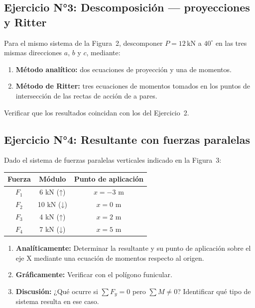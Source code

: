 \documentclass[11pt,a4paper]{article}
\begin{document}
\subsection*{Ejercicio N°3: Descomposición — proyecciones y Ritter}

Para el mismo sistema de la Figura~2, descomponer $P = 12\,\text{kN}$ a $40^\circ$
en las tres mismas direcciones $a$, $b$ y $c$, mediante:

\begin{enumerate}[label=\alph*)]
    \item \textbf{Método analítico:} dos ecuaciones de proyección y una de momentos.
    \item \textbf{Método de Ritter:} tres ecuaciones de momentos tomados en los puntos de intersección de las rectas de acción de a pares.
\end{enumerate}

Verificar que los resultados coincidan con los del Ejercicio~2.

\subsection*{Ejercicio N°4: Resultante con fuerzas paralelas}

Dado el sistema de fuerzas paralelas verticales indicado en la Figura~3:

\begin{center}
\begin{tabular}{ccc}
\hline
\textbf{Fuerza} & \textbf{Módulo} & \textbf{Punto de aplicación} \\
\hline
$F_1$ & 6 kN (↑) & $x = -3$ m \\
$F_2$ & 10 kN (↓) & $x = 0$ m \\
$F_3$ & 4 kN (↑) & $x = 2$ m \\
$F_4$ & 7 kN (↓) & $x = 5$ m \\
\hline
\end{tabular}
\end{center}

\begin{enumerate}[label=\alph*)]
    \item \textbf{Analíticamente:} Determinar la resultante y su punto de aplicación sobre el eje X mediante una ecuación de momentos respecto al origen.
    \item \textbf{Gráficamente:} Verificar con el polígono funicular.
    \item \textbf{Discusión:} ¿Qué ocurre si $\sum F_y = 0$ pero $\sum M \neq 0$? Identificar qué tipo de sistema resulta en ese caso.
\end{enumerate}
\end{document}
